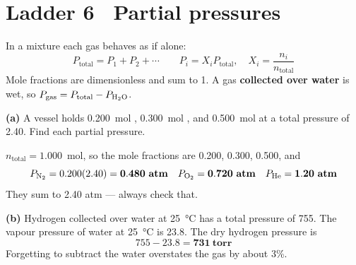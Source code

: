 \documentclass{apchem-worksheet}
\begin{document}
\section*{\sffamily Ladder 6 \textbullet\ Partial pressures}

In a mixture each gas behaves as if alone:
\[ P_{\text{total}} = P_1 + P_2 + \cdots \qquad
   P_i = X_i P_{\text{total}}, \quad
   X_i = \frac{n_i}{n_{\text{total}}} \]
Mole fractions are dimensionless and sum to 1. A gas
\textbf{collected over water} is wet, so
$P_{\text{gas}} = P_{\text{total}} - P_{\ce{H2O}}$.

\begin{workedexample}
\textbf{(a)} A vessel holds \SI{0.200}{\mole} ,
\SI{0.300}{\mole} , and \SI{0.500}{\mole}  at a total
pressure of \SI{2.40}{\atm}. Find each partial pressure.

$n_{\text{total}} = 1.000$~mol, so the mole fractions are 0.200, 0.300,
0.500, and
\[ P_{\ce{N2}} = 0.200(2.40) = \mathbf{0.480~atm} \quad
   P_{\ce{O2}} = \mathbf{0.720~atm} \quad
   P_{\ce{He}} = \mathbf{1.20~atm} \]
They sum to 2.40 atm --- always check that.

\textbf{(b)} Hydrogen collected over water at \SI{25}{\celsius} has a
total pressure of \SI{755}{\torr}. The vapour pressure of water at
\SI{25}{\celsius} is \SI{23.8}{\torr}. The dry hydrogen pressure is
\[ 755 - 23.8 = \mathbf{731~torr} \]
Forgetting to subtract the water overstates the gas by about 3\%.
\end{workedexample}
\end{document}
